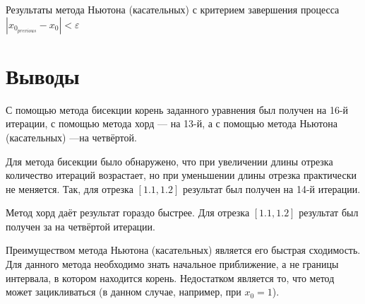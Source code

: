 Результаты метода Ньютона (касательных) с критерием завершения процесса $ \left| x_{0_{previous}} - x_0 \right| < \varepsilon $
\lstset{inputencoding=utf8, extendedchars=\true}


\chapter*{Выводы}

С помощью метода бисекции корень заданного уравнения был получен на 16-й итерации,
с помощью метода хорд --- на 13-й,
а с помощью метода Ньютона (касательных) ---на четвёртой.

Для метода бисекции было обнаружено, что при увеличении длины отрезка количество итераций возрастает, но при уменьшении длины отрезка практически не меняется.
Так, для отрезка $ \left[ 1.1, 1.2 \right] $ результат был получен на 14-й итерации.

Метод хорд даёт результат гораздо быстрее.
Для отрезка $ \left[ 1.1, 1.2 \right] $ результат был получен за на четвёртой итерации.

Преимуществом метода Ньютона (касательных) является его быстрая сходимость.
Для данного метода необходимо знать начальное приближение, а не границы интервала, в котором находится корень.
Недостатком является то, что метод может зацикливаться (в данном случае, например, при $x_0 = 1$).


